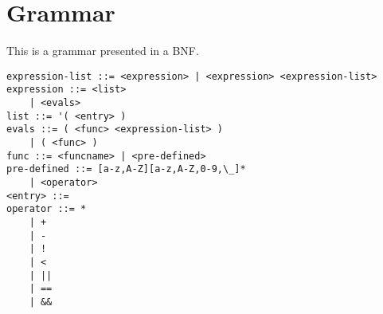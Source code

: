\section{Grammar}

This is a grammar presented in a BNF. 


\begin{lstlisting}
expression-list ::= <expression> | <expression> <expression-list>
expression ::= <list> 
	| <evals>
list ::= '( <entry> )
evals ::= ( <func> <expression-list> ) 
	| ( <func> )
func ::= <funcname> | <pre-defined>
pre-defined ::= [a-z,A-Z][a-z,A-Z,0-9,\_]*
	| <operator> 
<entry> ::= 
operator ::= *
	| +
	| -
	| !
	| < 
	| ||
	| ==
	| &&
\end{lstlisting}


